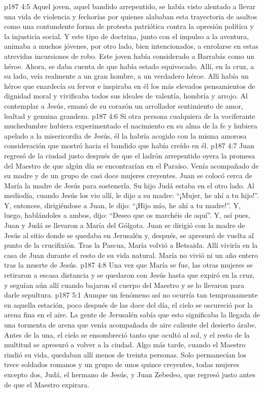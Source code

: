 \vs p187 4:5 \pc Aquel joven, aquel bandido arrepentido, se había visto alentado a llevar una vida de violencia y fechorías por quienes alababan esta trayectoria de asaltos como una contundente forma de protesta patriótica contra la opresión política y la injusticia social. Y este tipo de doctrina, junto con el impulso a la aventura, animaba a muchos jóvenes, por otro lado, bien intencionados, a enrolarse en estas atrevidas incursiones de robo. Este joven había considerado a Barrabás como un héroe. Ahora, se daba cuenta de que había estado equivocado. Allí, en la cruz, a su lado, veía realmente a un gran hombre, a un verdadero héroe. Allí había un héroe que enardecía su fervor e inspiraba en él los más elevados pensamientos de dignidad moral y vivificaba todos sus ideales de valentía, hombría y arrojo. Al contemplar a Jesús, emanó de su corazón un arrollador sentimiento de amor, lealtad y genuina grandeza.
\vs p187 4:6 Si otra persona cualquiera de la vociferante muchedumbre hubiera experimentado el nacimiento en su alma de la fe y hubiera apelado a la misericordia de Jesús, él la habría acogido con la misma amorosa consideración que mostró hacia el bandido que había creído en él.
\vs p187 4:7 \pc Juan regresó de la ciudad justo después de que el ladrón arrepentido oyera la promesa del Maestro de que algún día se encontrarían en el Paraíso. Venía acompañado de su madre y de un grupo de casi doce mujeres creyentes. Juan se colocó cerca de María la madre de Jesús para sostenerla. Su hijo Judá estaba en el otro lado. Al mediodía, cuando Jesús los vio allí, le dijo a su madre: “¡Mujer, he ahí a tu hijo!”. Y, entonces, dirigiéndose a Juan, le dijo: “¡Hijo mío, he ahí a tu madre!”. Y, luego, hablándoles a ambos, dijo: “Deseo que os marchéis de aquí”. Y, así pues, Juan y Judá se llevaron a María del Gólgota. Juan se dirigió con la madre de Jesús al sitio donde se quedaba en Jerusalén y, después, se apresuró de vuelta al punto de la crucifixión. Tras la Pascua, María volvió a Betsaida. Allí viviría en la casa de Juan durante el resto de su vida natural. María no vivió ni un año entero tras la muerte de Jesús.
\vs p187 4:8 Una vez que María se fue, las otras mujeres se retiraron a escasa distancia y se quedaron con Jesús hasta que expiró en la cruz, y seguían aún allí cuando bajaron el cuerpo del Maestro y se lo llevaron para darle sepultura.
\vs p187 5:1 Aunque un fenómeno así no ocurría tan tempranamente en aquella estación, poco después de las doce del día, el cielo se oscureció por la arena fina en el aire. La gente de Jerusalén sabía que esto significaba la llegada de una tormenta de arena que venía acompañada de aire caliente del desierto árabe. Antes de la una, el cielo se ensombreció tanto que ocultó al sol, y el resto de la multitud se apresuró a volver a la ciudad. Algo más tarde, cuando el Maestro rindió su vida, quedaban allí menos de treinta personas. Solo permanecían los trece soldados romanos y un grupo de unos quince creyentes, todas mujeres excepto dos, Judá, el hermano de Jesús, y Juan Zebedeo, que regresó justo antes de que el Maestro expirara.
